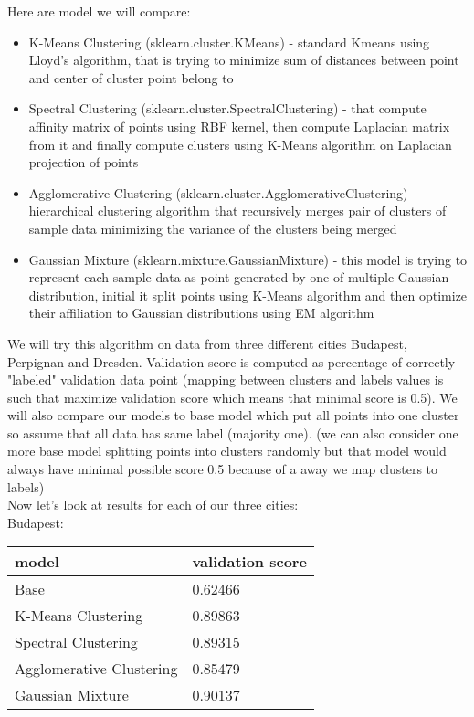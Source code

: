 \documentclass[a4paper]{article}
\begin{document}
	Here are model we will compare:
	\begin{itemize}
		\item K-Means Clustering (sklearn.cluster.KMeans) - standard Kmeans using Lloyd's algorithm, that is trying to minimize sum of distances between point and center of cluster point belong to
		\item Spectral Clustering (sklearn.cluster.SpectralClustering) - that compute affinity matrix of points using RBF kernel, then compute Laplacian matrix from it and finally compute clusters using K-Means algorithm on Laplacian projection of points
		\item Agglomerative Clustering (sklearn.cluster.AgglomerativeClustering) - hierarchical clustering algorithm that recursively merges pair of clusters of sample data minimizing the variance of the clusters being merged
		\item Gaussian Mixture (sklearn.mixture.GaussianMixture) - this model is trying to represent each sample data as point generated by one of multiple Gaussian distribution, initial it split points using K-Means algorithm and then optimize their affiliation to Gaussian distributions using EM algorithm
	\end{itemize}

	We will try this algorithm on data from three different cities Budapest, Perpignan and Dresden. Validation score is computed as percentage of correctly "labeled" validation data point (mapping between clusters and labels values is such that maximize validation score which means that minimal score is 0.5). We will also compare our models to base model which put all points into one cluster so assume that all data has same label (majority one). (we can also consider one more base model splitting points into clusters randomly but that model would always have minimal possible score 0.5 because of a away we map clusters to labels)
	\\
	
	Now let's look at results for each of our three cities:
	\\
	
	Budapest:
	\begin{table}[!h]
		\begin{tabular}{|l|l|}
			\hline
			model &  validation score  \\ \hline
			Base & 0.62466 \\ \hline
			K-Means Clustering & 0.89863 \\ \hline
			Spectral Clustering &  0.89315 \\ \hline
			Agglomerative Clustering  &  0.85479 \\ \hline
			Gaussian Mixture &  0.90137 \\ \hline
		\end{tabular}
	\end{table} 
\end{document}
